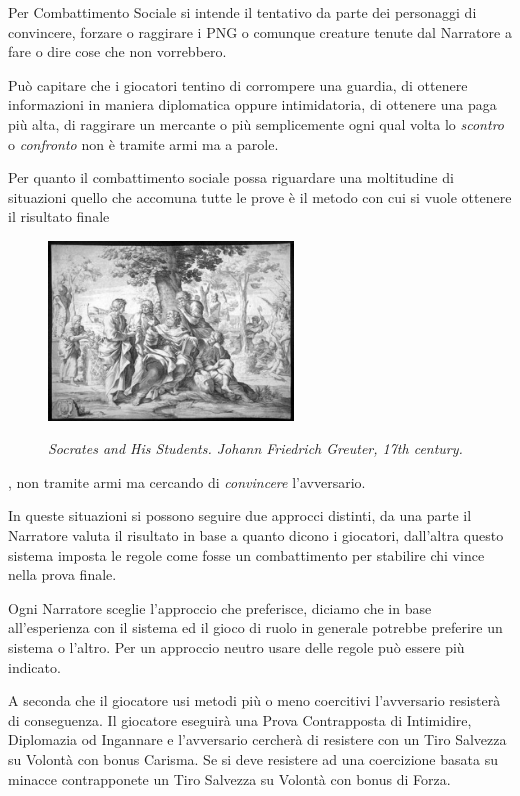 \begin{multicols}{2}

Per Combattimento Sociale si intende il tentativo da parte dei personaggi di convincere, forzare o raggirare i PNG o comunque creature tenute dal Narratore a fare o dire cose che non vorrebbero.

Può capitare che i giocatori tentino di corrompere una guardia, di ottenere informazioni in maniera diplomatica oppure intimidatoria, di ottenere una paga più alta, di raggirare un mercante o più semplicemente ogni qual volta lo \emph{scontro} o \emph{confronto} non è tramite armi ma a parole.

Per quanto il combattimento sociale possa riguardare una moltitudine di situazioni quello che accomuna tutte le prove è il metodo con cui si vuole ottenere il risultato finale

\begin{figure}%

\centering
\includegraphics[width=6.5cm]{immagini/Greuter_Socrates.png}

\emph{Socrates and His Students. Johann Friedrich Greuter, 17th century.}
\end{figure}

, non tramite armi ma cercando di \emph{convincere} l'avversario.

In queste situazioni si possono seguire due approcci distinti, da una parte il Narratore valuta il risultato in base a quanto dicono i giocatori, dall'altra questo sistema imposta le regole come fosse un combattimento per stabilire chi vince nella prova finale.

Ogni Narratore sceglie l'approccio che preferisce, diciamo che in base all'esperienza con il sistema ed il gioco di ruolo in generale potrebbe preferire un sistema o l'altro. Per un approccio neutro usare delle regole può essere più indicato.

A seconda che il giocatore usi metodi più o meno coercitivi l'avversario resisterà di conseguenza.
Il giocatore eseguirà una Prova Contrapposta di Intimidire, Diplomazia od Ingannare e l'avversario cercherà di resistere con un Tiro Salvezza su Volontà con bonus Carisma.
Se si deve resistere ad una coercizione basata su minacce contrapponete un Tiro Salvezza su Volontà con bonus di Forza.


\end{multicols}
